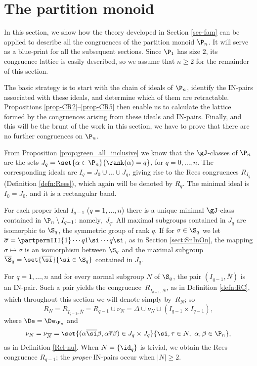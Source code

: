 \section{The partition monoid }
\label{sec:Pn}

In this section, we show how the theory developed in Section \ref{sec-fam} can be applied to describe all the congruences of the partition monoid $\P_n$. 
It will serve as a blue-print for all the subsequent sections.  Since $\P_1$ has size $2$, its congruence lattice is easily described, so we assume that $n\geq2$ for the remainder of this section.

The basic strategy is to start with the chain of ideals of $\P_n$,
identify the IN-pairs associated with these ideals, and determine which of them are retractable. 
Propositions \ref{prop-CR2}--\ref{prop-CR5} then enable us to calculate the lattice formed by the congruences arising from these ideals and IN-pairs. Finally, and this will be the brunt of the work in this section, we have to prove that there are no further congruences on $\P_n$.

From Proposition \ref{prop:green_all_inclusive} we know that the $\gJ$-classes of $\P_n$ are the sets
$J_q=\set{\alpha\in\P_n}{\rank(\alpha)=q}$, for $q=0,\dots,n$.
The corresponding ideals are $I_q=J_0\cup\dots\cup J_q$,
giving rise to the Rees congruences $R_{I_q}$ (Definition \ref{defn:Rees}), which again will be denoted by $R_q$. 
The minimal ideal is $I_0=J_0$, and it is a rectangular band.

For each proper ideal $I_{q-1}$ ($q=1,\dots,n$) there is a unique minimal $\gJ$-class 
contained in $\P_n\setminus I_{q-1}$: namely,~$J_{q}$. All maximal subgroups contained in $J_q$ are isomorphic to $\S_q$, the symmetric group of rank $q$. 
If for $\sigma\in\S_q$ we let 
$\overline{\sigma}=\partpermIII{1}\cdots{q}{{1\si}}\cdots{{q\si}}$, as in Section \ref{sect:SnInOn}, the mapping $\sigma\mapsto \overline{\sigma}$ is an isomorphism between $\S_q$ and the maximal subgroup $\overline{\S}_q=\set{\overline\si}{\si\in\S_q}$ contained in $J_q$.  

For $q=1,\ldots,n$ and for every normal subgroup $N$ of $\S_q$, the pair $(I_{q-1},\overline{N})$ is an IN-pair. Such a pair yields the congruence~$R_{I_{q-1},\overline N}$, as in Definition \ref{defn:RC}, which throughout this section we will denote simply by~$R_N$; so
\[
R_N=R_{I_{q-1},\overline N} = R_{q-1}\cup\nu_N=\Delta\cup \nu_{N}\cup (I_{q-1}\times I_{q-1}),
\]
where $\De=\De_{\P_n}$ and
\[
\nu_{N}=\nu_{\overline N}=\set{ (\alpha\overline\si\beta,\alpha\overline\tau\beta)\in J_q\times J_q}{\si,\tau\in N,\ \alpha,\beta\in\P_n},
\]
as in Definition \ref{Rel-nu}.
When $N=\{\id_q\}$ is trivial, we obtain the Rees congruence $R_{q-1}$; the \emph{proper} IN-pairs occur when $|N|\geq2$.







